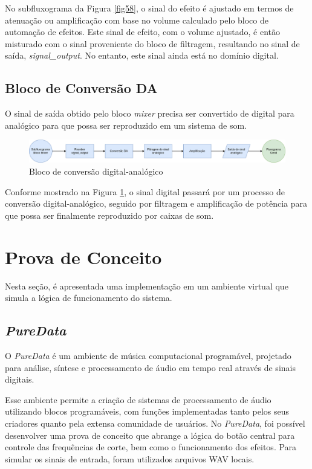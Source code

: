 No subfluxograma da Figura \ref{fig58}, o sinal do efeito é ajustado em termos de atenuação ou amplificação com base no volume calculado pelo bloco de automação de efeitos. Este sinal de efeito, com o volume ajustado, é então misturado com o sinal proveniente do bloco de filtragem, resultando no sinal de saída, \textit{signal\_output}. No entanto, este sinal ainda está no domínio digital.

\subsection{Bloco de Conversão DA}

O sinal de saída obtido pelo bloco \textit{mixer} precisa ser convertido de digital para analógico para que possa ser reproduzido em um sistema de som.

\begin{figure}[h]
    \centering
    \includegraphics[width=\textwidth]{figuras/fig59.png}
    \caption{Bloco de conversão digital-analógico}
    \label{fig59}
\end{figure}

Conforme mostrado na Figura \ref{fig59}, o sinal digital passará por um processo de conversão digital-analógico, seguido por filtragem e amplificação de potência para que possa ser finalmente reproduzido por caixas de som.

\newpage
\section{Prova de Conceito}

Nesta seção, é apresentada uma implementação em um ambiente virtual que simula a lógica de funcionamento do sistema.

\subsection{\textit{PureData}}

O \textit{PureData} \cite{puredata} é um ambiente de música computacional programável, projetado para análise, síntese e processamento de áudio em tempo real através de sinais digitais.

Esse ambiente permite a criação de sistemas de processamento de áudio utilizando blocos programáveis, com funções implementadas tanto pelos seus criadores quanto pela extensa comunidade de usuários. No \textit{PureData}, foi possível desenvolver uma prova de conceito que abrange a lógica do botão central para controle das frequências de corte, bem como o funcionamento dos efeitos. Para simular os sinais de entrada, foram utilizados arquivos WAV locais.

